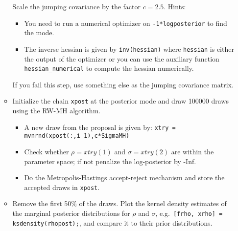 \documentclass{article}
\begin{document}
\begin{enumerate}
\begin{itemize}
		Scale the jumping covariance by the factor \(c=2.5\).
		Hints:
		\begin{itemize}
			\item You need to run a numerical optimizer on \texttt{-1*logposterior} to find the mode.
			\item The inverse hessian is given by \texttt{inv(hessian)} where \texttt{hessian} is either the output of the optimizer
			or you can use the auxiliary function \texttt{hessian\_numerical} to compute the hessian numerically.
		\end{itemize}
		If you fail this step, use something else as the jumping covariance matrix.
		\item Initialize the chain \texttt{xpost} at the posterior mode and draw 100000 draws using the RW-MH algorithm.
		\begin{itemize}
			\item A new draw from the proposal is given by: \texttt{xtry = mvnrnd(xpost(:,i-1),c*SigmaMH)}
			\item Check whether \(\rho=xtry(1)\) and \(\sigma=xtry(2)\) are within the parameter space; if not penalize the log-posterior by -Inf.
			\item Do the Metropolis-Hastings accept-reject mechanism and store the accepted draws in \texttt{xpost}.
		\end{itemize}
		\item Remove the first 50\% of the draws.
		Plot the kernel density estimates of the marginal posterior distributions for \(\rho \) and \(\sigma \), e.g.\ \texttt{[frho, xrho] = ksdensity(rhopost);},
		and compare it to their prior distributions.
	\end{itemize}
\end{enumerate}

\newpage


\newpage

\appendix
\end{document}

